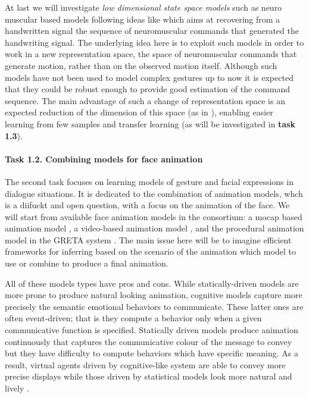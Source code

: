   At last we will investigate {\it low dimensional state space models} such as neuro muscular based models following ideas like \cite{DBLP:conf/icfhr/FischerPOS14} which aims at recovering from a handwritten signal the sequence of neuromuscular commands that generated the handwriting signal. The underlying idea here is to exploit such models in order to work in a new representation space, the space of neuromuscular commands that generate motion, rather than on the observed motion itself. 
  Although such models have not been used to model complex gestures up to now it is expected that they could be robust enough to provide good estimation of the command sequence. The main advantage of such a change of representation space is an expected reduction of the dimension of this space (as in \cite{DBLP:journals/pami/WangFH08}), enabling easier learning from few samples and transfer learning (as will be investigated in \textbf{task 1.3}).
% 


\paragraph{Task 1.2. Combining models for face animation } 

The second task focuses on learning models of gesture and facial expressions in dialogue situations. It is dedicated to the combination of animation models, whch is a diifuckt and open question, with a focus on the animation of the face. We will start from available face animation models in the consortium:  a mocap based animation model \cite{YuThesis}, a video-based animation model \cite{Barbulescu2014}, and the procedural animation model in the GRETA system  \cite{greta}. The main issue here will be to imagine efficient frameworks for inferring based on the scenario of the animation which model to use or combine to produce a final animation.


All of these models types have pros and cons. While statically-driven models are more prone to produce natural looking animation, cognitive
models capture more precisely the semantic emotional behaviors to communicate. These latter ones are often event-driven; that is they compute a behavior only when a given communicative function is specified. Statically driven models produce animation continuously that captures the communicative colour of the message to convey but they have difficulty to compute behaviors which have specific meaning. As a result, virtual agents driven by cognitive-like system are able to convey more precise displays while those driven by statistical models look more natural and lively \cite{DBLP:conf/iva/LeeM12}.

